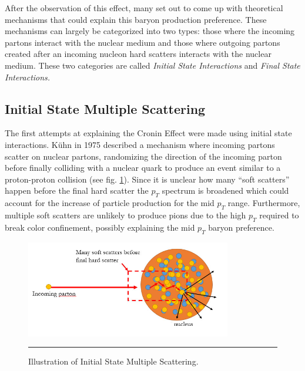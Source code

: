 After the observation of this effect, many set out to come up with theoretical mechanisms that could explain this baryon production preference. These mechanisms can largely be categorized into two types: those where the incoming partons interact with the nuclear medium and those where outgoing partons created after an incoming nucleon hard scatters interacts with the nuclear medium. These two categories are called \textit{Initial State Interactions} and \textit{Final State Interactions.}

\subsection{Initial State Multiple Scattering}
The first attempts at explaining the Cronin Effect were made using initial state interactions. K\"{u}hn in 1975 described a mechanism where incoming partons scatter on nuclear partons, randomizing the direction of the incoming parton before finally colliding with a nuclear quark to produce an event similar to a proton-proton collision\citep{PhysRevD.13.2948} (see fig. \ref{fig:ISIscattering}). Since it is unclear how many ``soft scatters'' happen before the final hard scatter the $p_{T}$ spectrum is broadened which could account for the increase of particle production for the mid $p_{T}$ range. Furthermore, multiple soft scatters are unlikely to produce pions due to the high $p_T$ required to break color confinement, possibly explaining the mid $p_T$ baryon preference.
\begin{figure}[htbp!]
  \centering
    \includegraphics[width=0.8\textwidth]{Figures/ISIscattering.jpg}
    \rule{35em}{0.5pt}
  \caption[Illustration of Initial State Multiple Scattering]{Illustration of Initial State Multiple Scattering.}
  \label{fig:ISIscattering}
\end{figure} 


